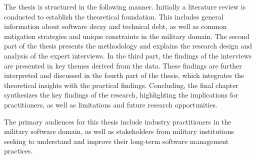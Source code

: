 The thesis is structured in the following manner. Initially a literature review is conducted to establish the theoretical foundation. This includes general information about software decay and technical debt,
as well as common mitigation strategies and unique constraints in the military domain. The second part of the thesis presents the methodology and explains the research design and analysis of the expert interviews.
In the third part, the findings of the interviews are presented in key themes derived from the data. These findings are further interpreted and discussed in the fourth part of the thesis, which integrates the theoretical insights with the practical findings.
Concluding, the final chapter synthesizes the key findings of the research, highlighting the implications for practitioners, as well as limitations and future research opportunities.

The primary audiences for this thesis include industry practitioners in the military software domain, as well as stakeholders from military institutions seeking to understand and improve their long-term software management practices.